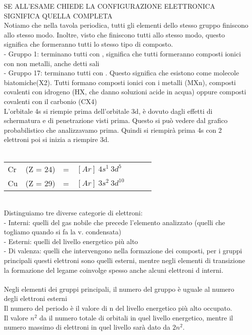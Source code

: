 SE ALL’ESAME CHIEDE LA CONFIGURAZIONE ELETTRONICA SIGNIFICA QUELLA COMPLETA\\
Notiamo che nella tavola periodica, tutti gli elementi dello stesso gruppo finiscono allo stesso modo. Inoltre, visto che finiscono tutti allo stesso modo, questo significa che formeranno tutti lo stesso tipo di composto.\\
\tab- Gruppo 1: terminano tutti con , significa che tutti formeranno composti ionici con non metalli, anche detti sali\\
\tab- Gruppo 17: terminano tutti con . Questo significa che esistono come molecole biatomiche(X2). Tutti formano composti ionici con i metalli (MXn), composti covalenti con idrogeno (HX, che danno soluzioni acide in acqua) oppure composti covalenti con il carbonio (CX4)\\
L’orbitale 4s si riempie prima dell’orbitale 3d, è dovuto dagli effetti  di schermatura e di penetrazione visti prima. Questo si può vedere dal grafico probabilistico che analizzavamo prima. Quindi si riempirà prima 4s con 2 elettroni poi si inizia a riempire 3d.\\\\
\begin{tabular}{l l l l lll}
  Cr&(Z = 24)&=&$[Ar]\ 4s^1\ 3d^5$\\
  Cu&(Z = 29)&=&$[Ar]\ 3s^2\ 3d^{10}$\\
\end{tabular}\\
Distinguiamo tre diverse categorie di elettroni:\\
\tab- Interni: quelli del gas nobile che precede l’elemento analizzato (quelli che togliamo quando si fa la v. condensata)\\
\tab- Esterni: quelli del livello energetico più alto\\
\tab- Di valenza: quelli che intervengono nella formazione dei composti, per i gruppi principali questi elettroni sono quelli esterni, mentre negli elementi di transizione la formazione del legame coinvolge spesso anche alcuni elettroni d interni. \\\\
Negli elementi dei gruppi principali, il numero del gruppo è uguale al numero degli elettroni esterni\\
Il numero del periodo è il valore di n del livello energetico più alto occupato.\\
Il valore $n^2$ da il numero totale di orbitali in quel livello energetico, mentre il numero massimo di elettroni in quel livello sarà dato da $2n^2$. \\
